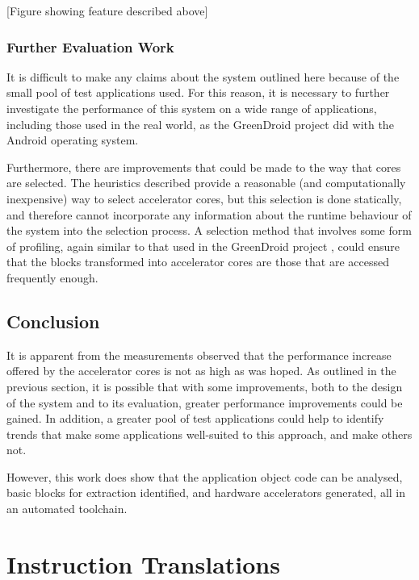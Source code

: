 \documentclass{UoYCSproject}
\begin{document}
[Figure showing feature described above]\\

\subsection{Further Evaluation Work}

It is difficult to make any claims about the system outlined here because of the small pool of test applications used.
For this reason, it is necessary to further investigate the performance of this system on a wide range of applications,
including those used in the real world, as the GreenDroid project \cite{greendroid} did with the Android operating system.

Furthermore, there are improvements that could be made to the way that cores are selected. The heuristics described provide
a reasonable (and computationally inexpensive) way to select accelerator cores, but this selection is done statically, and
therefore cannot incorporate any information about the runtime behaviour of the system into the selection process.
A selection method that involves some form of profiling, again similar to that used in the GreenDroid project \cite{greendroid},
could ensure that the blocks transformed into accelerator cores are those that are accessed frequently enough.

\section{Conclusion}

It is apparent from the measurements observed that the performance increase offered by the accelerator cores is not
as high as was hoped. As outlined in the previous section, it is possible that with some improvements,
both to the design of the system and to its evaluation, greater performance improvements could be gained.
In addition, a greater pool of test applications could help to identify trends that make some applications
well-suited to this approach, and make others not.

However, this work does show that the application object code can be analysed, basic blocks for extraction
identified, and hardware accelerators generated, all in an automated toolchain.

\appendix

\chapter{Instruction Translations}
\end{document}
